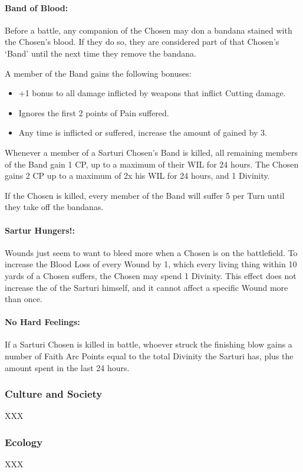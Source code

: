 \documentclass[oneside,11pt,english]{book}
\begin{document}
 

\paragraph{Band of Blood:}
Before a battle, any companion of the Chosen may don a bandana stained with the Chosen's blood. If they do so, they are considered part of that Chosen's ‘Band’ until the next time they remove the bandana. 


A member of the Band gains the following bonuses: 
\begin{itemize}
\item +1 bonus to all damage inflicted by weapons that inflict Cutting damage. 
\item Ignores the first 2 points of Pain suffered. 
\item Any time  is inflicted or suffered, increase the amount of  gained 
by 3. 
\end{itemize}
Whenever a member of a Sarturi Chosen's Band is killed, all remaining members of the Band 
gain 1 CP, up to a maximum of their WIL for 24 hours. The Chosen gains 2 CP up to a maximum 
of 2x his WIL for 24 hours, and 1 Divinity. 


If the Chosen is killed, every member of the Band will suffer 5  per Turn until they 
take off the bandanas. 
\paragraph{Sartur Hungers!:}
Wounds just seem to want to bleed more when a Chosen is on the battlefield. To increase the 
Blood Loss of every Wound by 1, which every living thing within 10 yards of a Chosen suffers, 
the Chosen may spend 1 Divinity. This effect does not increase the  of the Sarturi 
himself, and it cannot affect a specific Wound more than once. 
\paragraph{No Hard Feelings:}
If a Sarturi Chosen is killed in battle, whoever struck the finishing blow gains a number of Faith 
Arc Points equal to the total Divinity the Sarturi has, plus the amount spent in the last 24 hours. 
\subsubsection*{Culture and Society} 
XXX 
\subsubsection*{Ecology} 
XXX 
\end{document}
